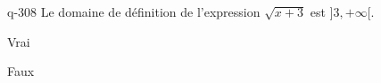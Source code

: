 \begin{truefalse}{q-308}
Le domaine de définition de l'expression $\sqrt{x+3}$ est $]3,+\infty[$.
\item Vrai
\item* Faux
\end{truefalse}

